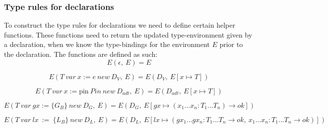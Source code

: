 \subsubsection{Type rules for declarations}
To construct the type rules for declarations we need to define certain helper functions. These functions need to return the updated type-environment given by a declaration, when we know the type-bindings for the environment $E$ prior to the declaration. The functions are defined as such:
\begin{equation}\label{typehelp1}
    E(\epsilon, \: E) = E
\end{equation}

\begin{equation}\label{typehelp2}
    E(T \: var \: x := e \: new \: D_V, \: E) = E(D_V, \: E[x \mapsto T])
\end{equation}

\begin{equation}\label{typehelpADT}
    E(T \: var \: x := \text{pin} \: Pin \: new \: D_{adt}, \: E) = E(D_{adt}, \: E[x \mapsto T])
\end{equation}

\begin{equation}\label{typehelp3}
    E(T \: var \: gx := \{G_B\} \: new \: D_G, \: E) = E(D_G, \: E[gx \mapsto (x_1...x_n : T_1...T_n)\xrightarrow{}ok])
\end{equation}

\begin{equation}\label{typehelp4}
    E(T \ var \ lx \: := \: \{L_B\} \: new \: D_L, \: E) = E(D_L, \: E[lx \mapsto (gx_1...gx_n : T_1...T_n \xrightarrow{} ok, \: x_1...x_n : T_1...T_n \xrightarrow{} ok)])
\end{equation}

